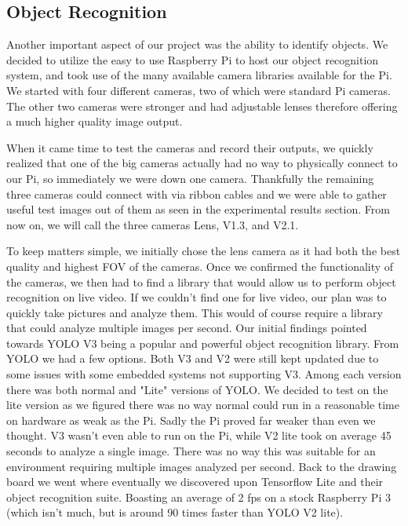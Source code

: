 \documentclass[letterpaper,12pt]{article}
\begin{document}
\subsection{Object Recognition}
Another important aspect of our project was the ability to identify objects. We decided to utilize the easy to use Raspberry Pi to host our object recognition system, and took use of the many available camera libraries available for the Pi. We started with four different cameras, two of which were standard Pi cameras. The other two cameras were stronger and had adjustable lenses therefore offering a much higher quality image output. \par
When it came time to test the cameras and record their outputs, we quickly realized that one of the big cameras actually had no way to physically connect to our Pi, so immediately we were down one camera. Thankfully the remaining three cameras could connect with via ribbon cables and we were able to gather useful test images out of them as seen in the experimental results section. From now on, we will call the three cameras Lens, V1.3, and V2.1. \par
To keep matters simple, we initially chose the lens camera as it had both the best quality and highest FOV of the cameras. Once we confirmed the functionality of the cameras, we then had to find a library that would allow us to perform object recognition on live video. If we couldn't find one for live video, our plan was to quickly take pictures and analyze them. This would of course require a library that could analyze multiple images per second. Our initial findings pointed towards YOLO V3 being a popular and powerful object recognition library. From YOLO we had a few options. Both V3 and V2 were still kept updated due to some issues with some embedded systems not supporting V3. Among each version there was both normal and "Lite" versions of YOLO. We decided to test on the lite version as we figured there was no way normal could run in a reasonable time on hardware as weak as the Pi. Sadly the Pi proved far weaker than even we thought. V3 wasn't even able to run on the Pi, while V2 lite took on average 45 seconds to analyze a single image. There was no way this was suitable for an environment requiring multiple images analyzed per second. Back to the drawing board we went where eventually we discovered upon Tensorflow Lite and their object recognition suite. Boasting an average of 2 fps on a stock Raspberry Pi 3 (which isn't much, but is around 90 times faster than YOLO V2 lite). \par
\end{document}
